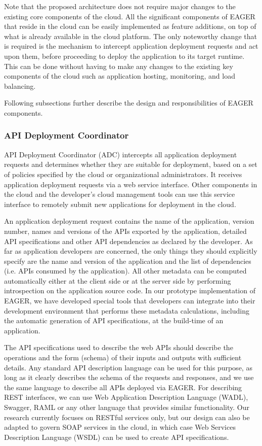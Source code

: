 Note that the proposed architecture does not require major changes to the existing core components of the cloud. All the 
significant components of EAGER that reside in the cloud can be easily implemented as feature additions, on top of what is already available 
in the cloud platform.
The only noteworthy change that is required is the mechanism to intercept application deployment requests and act upon them, before
proceeding to deploy the application to its target runtime. This can be done without having to make any changes to the existing key 
components of the cloud such as application hosting, monitoring, and load balancing.

Following subsections further describe the design and responsibilities of EAGER components.

\subsubsection{API Deployment Coordinator}
API Deployment Coordinator (ADC) intercepts all application deployment requests and determines whether they are suitable for deployment, based
on a set of policies specified by the cloud or organizational administrators. It receives application deployment requests via a web service interface.
Other components in the cloud and the developer's cloud management tools can use this service interface to remotely submit new applications for
deployment in the cloud. 

An application deployment request contains the name of the application, version number, names and versions of the APIs
exported by the application, detailed API specifications and other API dependencies as declared by the developer. As far as application developers are
concerned, the only things they should explicitly specify are the name and version of the application and the list of dependencies (i.e. APIs consumed
by the application). All other metadata can be computed automatically either at the client side or at the server side by performing introspection on the
application source code. In our prototype implementation of EAGER, we have developed special tools that developers can integrate into their
development environment that performs these metadata calculations, including the automatic generation of API specifications, at the build-time
of an application.

The API specifications used to describe the web APIs should describe the operations and the form (schema) of their inputs and outputs with sufficient 
details. Any standard API description language can be used for this purpose, as long as it clearly describes the schema of the requests and
responses, and we use the same language to describe all APIs deployed via EAGER. For describing REST interfaces, we can use Web Application
Description Language (WADL), Swagger, RAML or any other language that provides similar functionality. Our research currently focuses on RESTful 
services only, but our design can also be adapted to govern SOAP services in the cloud, in which case Web Services Description Language 
(WSDL) can be used to create API specifications.

